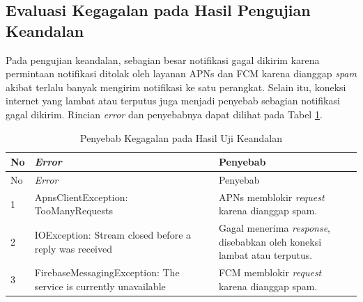 \subsection{Evaluasi Kegagalan pada Hasil Pengujian Keandalan}
\par Pada pengujian keandalan, sebagian besar notifikasi gagal dikirim karena permintaan notifikasi ditolak oleh layanan APNs dan FCM karena dianggap \textit{spam} akibat terlalu banyak mengirim notifikasi ke satu perangkat. Selain itu, koneksi internet yang lambat atau terputus juga menjadi penyebab sebagian notifikasi gagal dikirim. Rincian \textit{error} dan penyebabnya dapat dilihat pada Tabel \ref{t:penyebab-gagal}.
\begin{longtable}{|p{0.5cm}|p{4.5cm}|p{4cm}|}
	\caption{Penyebab Kegagalan pada Hasil Uji Keandalan} \label{t:penyebab-gagal} \\ \hline
	\rowcolor{lightgray} No & \textit{Error} & Penyebab \\ \hline
	\endfirsthead
	\hline
	\rowcolor{lightgray} No & \textit{Error} & Penyebab \\ \hline
	\endhead
	1 & ApnsClientException: TooManyRequests & APNs memblokir \textit{request} karena dianggap spam. \\ \hline
	2 & IOException: Stream closed before a reply was received & Gagal menerima \textit{response}, disebabkan oleh koneksi lambat atau terputus. \\ \hline
	3 & FirebaseMessagingException: The service is currently unavailable & FCM memblokir \textit{request} karena dianggap spam. \\ \hline
\end{longtable}

